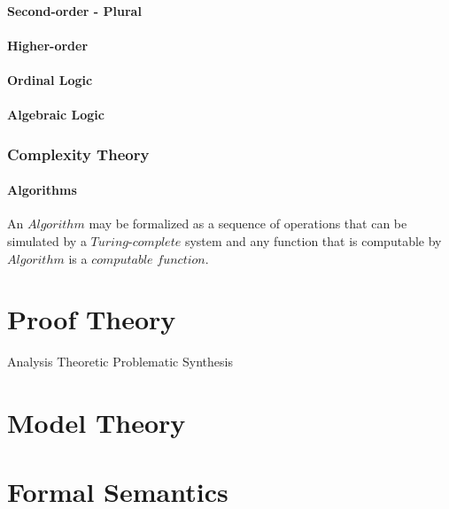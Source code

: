 \documentclass{article}
\begin{document}
\subsection{Second-order - Plural}

\subsection{Higher-order}

\subsection{Ordinal Logic}

\subsection{Algebraic Logic}


\section{Complexity Theory}

\subsection{Algorithms}
    An $Algorithm$ may be formalized as a sequence of operations that
    can be simulated by a $Turing$-$complete$ system and any function
    that is computable by $Algorithm$ is a $computable$ $function$.

\part{Proof Theory}

Analysis
    Theoretic
    Problematic
Synthesis


\part{Model Theory}

\part{Formal Semantics}
\end{document}
